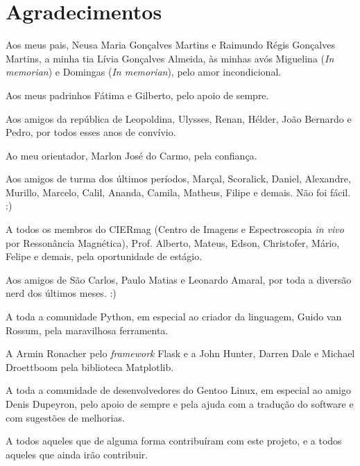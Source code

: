 \chapter*{Agradecimentos}

Aos meus pais, Neusa Maria Gonçalves Martins e Raimundo Régis Gonçalves
Martins, a minha tia Lívia Gonçalves Almeida, às minhas avós Miguelina
(\textit{In memorian}) e Domingas (\textit{In memorian}), pelo amor
incondicional.

Aos meus padrinhos Fátima e Gilberto, pelo apoio de sempre.

Aos amigos da república de Leopoldina, Ulysses, Renan, Hélder, João Bernardo
e Pedro, por todos esses anos de convívio.

Ao meu orientador, Marlon José do Carmo, pela confiança.

Aos amigos de turma dos últimos períodos, Marçal, Scoralick, Daniel,
Alexandre, Murillo, Marcelo, Calil, Ananda, Camila, Matheus, Filipe e
demais. Não foi fácil. :)

A todos os membros do CIERmag (Centro de Imagens e Espectroscopia
\textit{in vivo} por Ressonância Magnética), Prof. Alberto, Mateus, Edson,
Christofer, Mário, Felipe e demais, pela oportunidade de estágio.

Aos amigos de São Carlos, Paulo Matias e Leonardo Amaral, por toda a diversão
nerd dos últimos meses. :)

A toda a comunidade Python, em especial ao criador da linguagem, Guido
van Rossum, pela maravilhosa ferramenta.

A Armin Ronacher pelo \textit{framework} Flask e a John Hunter, Darren
Dale e Michael Droettboom pela biblioteca Matplotlib.

A toda a comunidade de desenvolvedores do Gentoo Linux, em especial ao
amigo Denis Dupeyron, pelo apoio de sempre e pela ajuda com a tradução do
software e com sugestões de melhorias.

A todos aqueles que de alguma forma contribuíram com este projeto, e a
todos aqueles que ainda irão contribuir.
